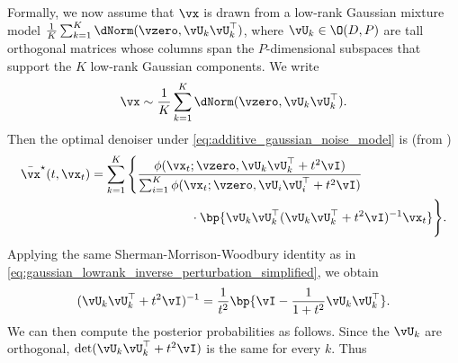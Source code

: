 \documentclass[../../book-main.tex]{subfiles}
\begin{document}
Formally, we now assume that \(\vx\) is drawn from a low-rank
Gaussian mixture model \(\frac{1}{K}\sum_{k = 1}^{K}\dNorm(\vzero,
\vU_{k}\vU_{k}^{\top})\), where \(\vU_{k} \in \O(D, P)\) are tall
orthogonal matrices whose columns span the \(P\)-dimensional
subspaces that support the \(K\) low-rank Gaussian components. We write
\begin{equation}\label{eq:MoG1}
    \vx \sim \frac{1}{K}\sum_{k = 1}^{K}\dNorm(\vzero, \vU_{k}\vU_{k}^{\top}).
\end{equation}
Then the optimal denoiser under
\eqref{eq:additive_gaussian_noise_model} is (from
)
\begin{align}
    \bar{\vx}^{\star}(t, \vx_{t})
    &= \sum_{k = 1}^{K}\Bigg\{\frac{\phi(\vx_{t} ; \vzero,
        \vU_{k}\vU_{k}^{\top} + t^{2}\vI)}{\sum_{i = 1}^{K}\phi(\vx_{t} ;
                \vzero, \vU_{i}\vU_{i}^{\top} +
        t^{2}\vI)} \\
        &\qquad \qquad \qquad \qquad
        \cdot\bp{\vU_{k}\vU_{k}^{\top}(\vU_{k}\vU_{k}^{\top} +
    t^{2}\vI)^{-1}\vx_{t}}\Bigg\}.
\end{align}
Applying the same Sherman-Morrison-Woodbury identity as in
\eqref{eq:gaussian_lowrank_inverse_perturbation_simplified}, we obtain
\begin{equation}
    (\vU_{k}\vU_{k}^{\top} + t^{2}\vI)^{-1} = \frac{1}{t^{2}}\bp{\vI
    - \frac{1}{1 + t^{2}}\vU_{k}\vU_{k}^{\top}}.
\end{equation}
We can then compute the posterior probabilities as follows. Since the
\(\vU_{k}\) are orthogonal, \(\det(\vU_{k}\vU_{k}^{\top}
+ t^{2}\vI)\) is the same for every \(k\). Thus
\end{document}
